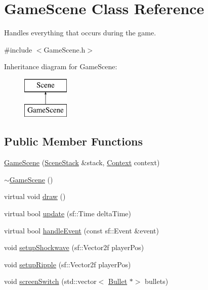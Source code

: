 \hypertarget{class_game_scene}{}\section{Game\+Scene Class Reference}
\label{class_game_scene}


Handles everything that occurs during the game.  




{\ttfamily \#include $<$Game\+Scene.\+h$>$}

Inheritance diagram for Game\+Scene\+:\begin{figure}[H]
\begin{center}
\leavevmode
\includegraphics[height=2.000000cm]{class_game_scene}
\end{center}
\end{figure}
\subsection*{Public Member Functions}
\begin{DoxyCompactItemize}
\item 
\hyperlink{class_game_scene_a09ae1eacea6ea92074d008c016e0ed1f}{Game\+Scene} (\hyperlink{class_scene_stack}{Scene\+Stack} \&stack, \hyperlink{struct_scene_1_1_context}{Context} context)
\item 
\hyperlink{class_game_scene_add5bc48c372aaa7f526c02558a8adf00}{$\sim$\+Game\+Scene} ()
\item 
virtual void \hyperlink{class_game_scene_ae9eb60cbb8fa55eeb07b951e3d83f426}{draw} ()
\item 
virtual bool \hyperlink{class_game_scene_ae54628d2f041bcad66242584b2db10d6}{update} (sf\+::\+Time delta\+Time)
\item 
virtual bool \hyperlink{class_game_scene_aa494372b1f451f3c3a268558fddb30f2}{handle\+Event} (const sf\+::\+Event \&event)
\item 
void \hyperlink{class_game_scene_a67664e1bbce6bec9eda855a9b109d9ec}{setup\+Shockwave} (sf\+::\+Vector2f player\+Pos)
\item 
void \hyperlink{class_game_scene_aca0b30f731595929fb7182e2f65941b1}{setup\+Ripple} (sf\+::\+Vector2f player\+Pos)
\item 
void \hyperlink{class_game_scene_a030583d6469d9f44fda3fc5777c46a08}{screen\+Switch} (std\+::vector$<$ \hyperlink{class_bullet}{Bullet} $\ast$$>$ bullets)
\end{DoxyCompactItemize}
